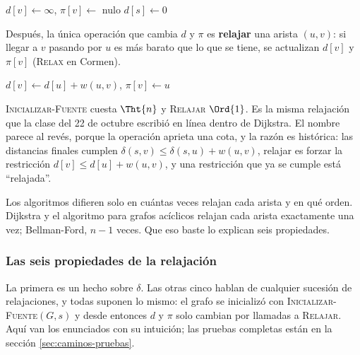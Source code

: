 \documentclass[11pt,letterpaper]{article}
\begin{document}
\begin{algorithm}[H]
\caption{\textsc{Inicializar-Fuente}$(G, s)$}
\label{alg:inicializar-fuente}
\begin{algorithmic}[1]
    \State $d[v] \gets \infty$, \quad $\pi[v] \gets$ nulo
  \EndFor
  \State $d[s] \gets 0$
\EndProcedure
\end{algorithmic}
\end{algorithm}

Después, la única operación que cambia $d$ y $\pi$ es
\textbf{relajar} una arista $(u, v)$: si llegar a $v$ pasando por $u$
es más barato que lo que se tiene, se actualizan $d[v]$ y $\pi[v]$
(\textsc{Relax} en Cormen).

\begin{algorithm}[H]
\caption{\textsc{Relajar}$(u, v, w)$}
\label{alg:relajar}
\begin{algorithmic}[1]
    \State $d[v] \gets d[u] + w(u, v)$, \quad $\pi[v] \gets u$
  \EndIf
\EndProcedure
\end{algorithmic}
\end{algorithm}

\textsc{Inicializar-Fuente} cuesta $\Tht{n}$ y \textsc{Relajar}
$\Ord{1}$. Es la misma relajación que la clase del 22 de octubre
escribió en línea dentro de Dijkstra. El nombre parece al revés,
porque la operación aprieta una cota, y la razón es histórica: las
distancias finales cumplen $\delta(s, v) \le \delta(s, u) + w(u, v)$,
relajar es forzar la restricción $d[v] \le d[u] + w(u, v)$, y una
restricción que ya se cumple está ``relajada''.

Los algoritmos difieren solo en cuántas veces relajan cada arista y en
qué orden. Dijkstra y el algoritmo para grafos acíclicos relajan cada
arista exactamente una vez; Bellman-Ford, $n - 1$ veces. Que eso
baste lo explican seis propiedades.

\subsubsection*{Las seis propiedades de la relajación}

La primera es un hecho sobre $\delta$. Las otras cinco hablan de
cualquier sucesión de relajaciones, y todas suponen lo mismo: el
grafo se inicializó con \textsc{Inicializar-Fuente}$(G, s)$ y desde
entonces $d$ y $\pi$ solo cambian por llamadas a \textsc{Relajar}.
Aquí van los enunciados con su intuición; las pruebas completas están
en la sección \ref{sec:caminos-pruebas}.
\end{document}
